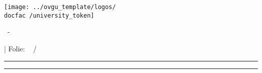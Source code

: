 {
	\hspace*{0.02\textwidth}
	\begin{minipage}[m]{0.3\textwidth}
		\vspace*{3ex}
		\texttt{[image: ../ovgu\_template/logos/\\docfac /university\_token]}
	\end{minipage}
	\begin{minipage}[m]{0.45\textwidth}
		\vspace*{3ex}
		\doctitle ~- \docsubtitle
	\end{minipage}
	\hfill
	\begin{minipage}[m]{0.16\textwidth} %
		\vspace*{3ex}
		| Folie: \hfill \insertframenumber ~ / \inserttotalframenumber
		\hspace*{0.1\textwidth}
	\end{minipage}
	\color{\docfac }
	\rule{\paperwidth}{1pt}
}
%
%
%
{
	\color{\docfac }
	\rule{\paperwidth}{1pt}
	\color{black}
	\begin{minipage}[c]{\textwidth}
		\vspace*{1ex}
		\hspace*{0.02\textwidth} \docauthor \hfill \docdate \hspace{0.02\textwidth}
		\vspace*{2ex}
	\end{minipage}
}

